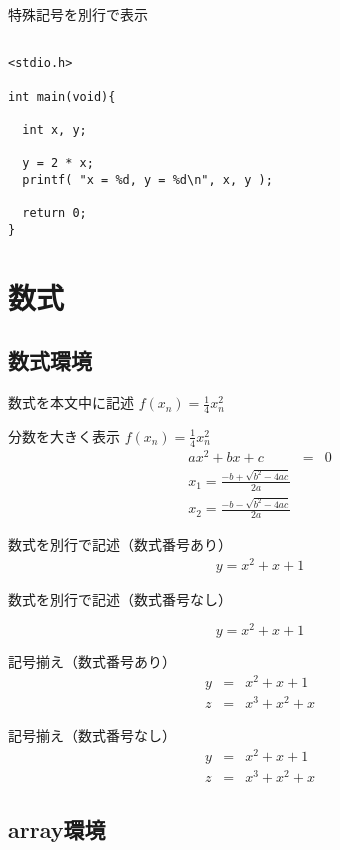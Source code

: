 \documentclass[12pt,a4j,twocolumn]{jarticle}
\begin{document}
特殊記号を別行で表示\\

\begin{verbatim}

<stdio.h>

int main(void){

  int x, y;

  y = 2 * x;
  printf( "x = %d, y = %d\n", x, y );

  return 0;
}

\end{verbatim}

\section{数式}

\subsection{数式環境}

数式を本文中に記述 $ f(x_n)=\frac{1}{4}x_n^2 $\par
分数を大きく表示 $ f(x_n)=\displaystyle\frac{1}{4}x_n^2 $\\

\begin{eqnarray}
  ax^2 + bx + c & = & 0\\
  x_1 = \frac{-b + \sqrt{b^2 - 4ac}}{2a} \\
  x_2 = \frac{-b - \sqrt{b^2 - 4ac}}{2a}
\end{eqnarray}

数式を別行で記述（数式番号あり）
\begin{eqnarray}
y = x^2 + x + 1
\end{eqnarray}

数式を別行で記述（数式番号なし）

\[
y = x^2 + x + 1
\]

記号揃え（数式番号あり）
\begin{eqnarray}
y & = & x^2 + x   + 1 \\
z & = & x^3 + x^2 + x
\end{eqnarray}

記号揃え（数式番号なし）
\begin{eqnarray*}
y & = & x^2 + x   + 1 \\
z & = & x^3 + x^2 + x
\end{eqnarray*}

\subsection{array環境}
\end{document}
